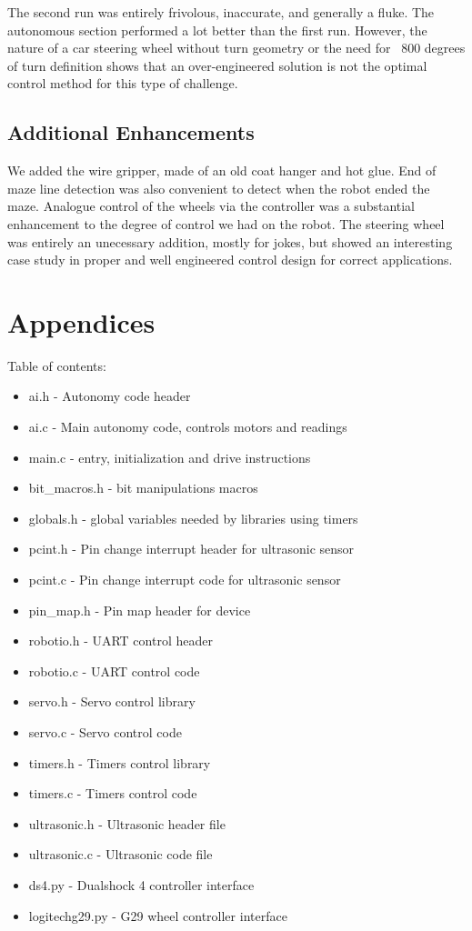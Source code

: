 \documentclass[letterpaper,11pt]{texMemo} %
\begin{document}
The second run was entirely frivolous, inaccurate, and generally a fluke. The autonomous section performed 
a lot better than the first run. However, the nature of a car steering wheel without turn geometry 
or the need for ~800 degrees of turn definition shows that an over-engineered solution is not the 
optimal control method for this type of challenge.

\subsection*{Additional Enhancements}
We added the wire gripper, made of an old coat hanger and hot glue. End of maze line detection was also 
convenient to detect when the robot ended the maze. Analogue control of the wheels via the controller 
was a substantial enhancement to the degree of control we had on the robot. The steering wheel was entirely an 
unecessary addition, mostly for jokes, but showed an interesting case study in proper and well engineered control 
design for correct applications.

\newpage
\section*{Appendices}
Table of contents:
\begin{itemize}
    \item ai.h - Autonomy code header
    \item ai.c - Main autonomy code, controls motors and readings
    \item main.c - entry, initialization and drive instructions
    \item bit\_macros.h - bit manipulations macros
    \item globals.h - global variables needed by libraries using timers
    \item pcint.h - Pin change interrupt header for ultrasonic sensor
    \item pcint.c - Pin change interrupt code for ultrasonic sensor
    \item pin\_map.h - Pin map header for device
    \item robotio.h - UART control header
    \item robotio.c - UART control code
    \item servo.h - Servo control library
    \item servo.c - Servo control code
    \item timers.h - Timers control library
    \item timers.c - Timers control code
    \item ultrasonic.h - Ultrasonic header file
    \item ultrasonic.c - Ultrasonic code file
    \item ds4.py - Dualshock 4 controller interface
    \item logitechg29.py - G29 wheel controller interface
\end{itemize}
\newpage
\end{document}
